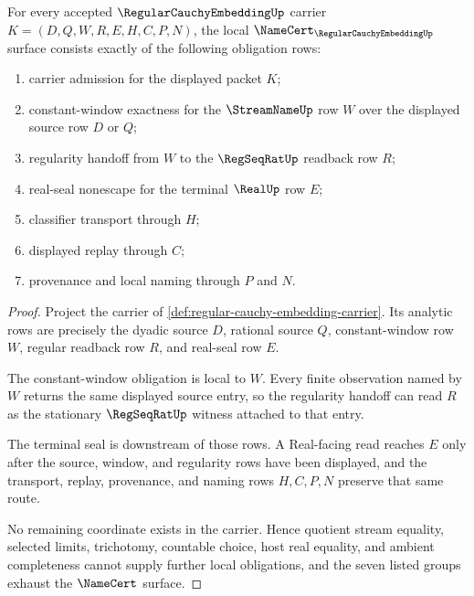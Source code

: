 \begin{theorem}
\label{thm:regular-cauchy-embedding-namecert-obligations}
For every accepted $\RegularCauchyEmbeddingUp$ carrier $K=(D,Q,W,R,E,H,C,P,N)$, the local $\NameCert_{\RegularCauchyEmbeddingUp}$ surface consists exactly of the following obligation rows:
\begin{enumerate}
\item carrier admission for the displayed packet $K$;
\item constant-window exactness for the $\StreamNameUp$ row $W$ over the displayed source row $D$ or $Q$;
\item regularity handoff from $W$ to the $\RegSeqRatUp$ readback row $R$;
\item real-seal nonescape for the terminal $\RealUp$ row $E$;
\item classifier transport through $H$;
\item displayed replay through $C$;
\item provenance and local naming through $P$ and $N$.
\end{enumerate}
\end{theorem}
\begin{proof}
Project the carrier of \autoref{def:regular-cauchy-embedding-carrier}. Its analytic rows are precisely the dyadic source $D$, rational source $Q$, constant-window row $W$, regular readback row $R$, and real-seal row $E$.

The constant-window obligation is local to $W$. Every finite observation named by $W$ returns the same displayed source entry, so the regularity handoff can read $R$ as the stationary $\RegSeqRatUp$ witness attached to that entry.

The terminal seal is downstream of those rows. A Real-facing read reaches $E$ only after the source, window, and regularity rows have been displayed, and the transport, replay, provenance, and naming rows $H,C,P,N$ preserve that same route.

No remaining coordinate exists in the carrier. Hence quotient stream equality, selected limits, trichotomy, countable choice, host real equality, and ambient completeness cannot supply further local obligations, and the seven listed groups exhaust the $\NameCert$ surface.
\end{proof}


